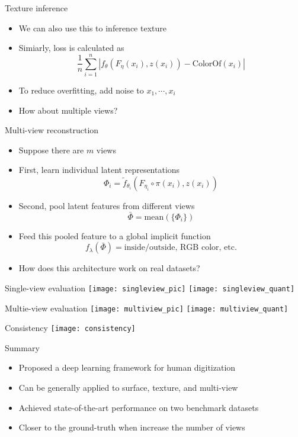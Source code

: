 \documentclass{beamer}
\begin{document}
	\begin{frame}{Texture inference}
		\begin{itemize}
			\item We can also use this to inference texture
			\item Simiarly, loss is calculated as
			$$\frac{1}{n}\sum_{i=1}^n\left|f_\theta\left(F_\eta\left(x_i\right),z(x_i)\right)-\text{ColorOf}\left(x_i\right)\right|$$
			\item To reduce overfitting, add noise to $x_1,\cdots,x_i$
			\item How about multiple views?
		\end{itemize}
	\end{frame}
	
	\begin{frame}{Multi-view reconstruction}
		\begin{itemize}
			\item Suppose there are $m$ views
			\item First, learn individual latent representations $$\Phi_i=\tilde{f}_{\theta_i}\left(F_{\eta_i}\circ\pi(x_i),z(x_i)\right)$$
			\item Second, pool latent features from different views $$\bar{\Phi}=\text{mean}\left(\{\Phi_i\}\right)$$
			\item Feed this pooled feature to a global implicit function $$f_\lambda\left(\bar{\Phi}\right)=\text{inside/outside, RGB color, etc.}$$
			\item How does this architecture work on real datasets?
		\end{itemize}
	\end{frame}

	\begin{frame}{Single-view evaluation}
		\texttt{[image: singleview\_pic]}
		\texttt{[image: singleview\_quant]}
	\end{frame}

	\begin{frame}{Multie-view evaluation}
		\texttt{[image: multiview\_pic]}
		\texttt{[image: multiview\_quant]}
	\end{frame}

	\begin{frame}{Consistency}
		\texttt{[image: consistency]}
	\end{frame}

	\begin{frame}{Summary}
		\begin{itemize}
			\item Proposed a deep learning framework for human digitization
			\item Can be generally applied to surface, texture, and multi-view
			\item Achieved state-of-the-art performance on two benchmark datasets
			\item Closer to the ground-truth when increase the number of views
		\end{itemize}
	\end{frame}
\end{document}
